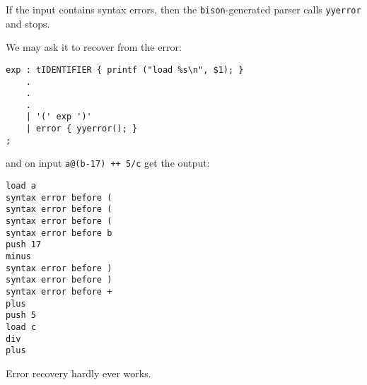 \begin{slide*}
If the input contains syntax errors, then the {\tt bison}-generated
parser calls {\tt yyerror} and stops.

We may ask it to recover from the error:
 
\begin{scriptsize}
\begin{verbatim}
exp : tIDENTIFIER { printf ("load %s\n", $1); }
    .
    .
    .
    | '(' exp ')'
    | error { yyerror(); }
;
\end{verbatim}
\end{scriptsize}

and on input {\tt a@(b-17) ++ 5/c} get the output:

\begin{scriptsize}
\begin{verbatim}
load a
syntax error before (
syntax error before (
syntax error before (
syntax error before b
push 17
minus
syntax error before )
syntax error before )
syntax error before +
plus
push 5
load c
div
plus
\end{verbatim}
\end{scriptsize}

Error recovery hardly ever works.
\vfil
\end{slide*}

